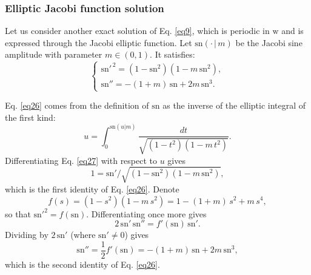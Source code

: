 \documentclass{article}
\begin{document}
            \subsubsection{Elliptic Jacobi function solution}
                Let us consider another exact solution of Eq. \ref{eq9}, which is periodic in \(\mathrm{w}\) and is expressed through the Jacobi elliptic function.
                Let \(\mathrm{sn}(\cdot\,|\,m)\) be the Jacobi sine amplitude with parameter \(m \in (0,1)\). It satisfies:
                \begin{equation} \label{eq26}
                    \begin{cases}
                        \mathrm{sn}'^{\,2} = \left(1-\mathrm{sn}^{2}\right)\left(1-m\,\mathrm{sn}^{2}\right),\\
                        \mathrm{sn}'' = -(1+m)\,\mathrm{sn} + 2m\,\mathrm{sn}^{3}.
                    \end{cases}
                \end{equation}

                Eq. \ref{eq26} comes from the definition of \(\mathrm{sn}\) as the inverse of the elliptic integral of the first kind:
                \begin{equation} \label{eq27}
                    u = \int_{0}^{\mathrm{sn}(u|m)} \frac{dt}{\sqrt{\left(1-t^{2}\right)\left(1-m\,t^{2}\right)}}.
                \end{equation}
                Differentiating Eq. \ref{eq27} with respect to \(u\) gives
                \begin{equation}
                    1 = \mathrm{sn}'\big/\sqrt{\left(1-\mathrm{sn}^{2}\right)\left(1-m\,\mathrm{sn}^{2}\right)},
                \end{equation}
                which is the first identity of Eq. \ref{eq26}.
                Denote
                \begin{equation}
                    f(s) = \left(1-s^{2}\right)\left(1-m\,s^{2}\right) = 1-(1+m)\,s^{2}+m\,s^{4},
                \end{equation}
                so that \(\mathrm{sn}'^{2} = f(\mathrm{sn})\). Differentiating once more gives
                \begin{equation}
                    2\,\mathrm{sn}'\,\mathrm{sn}'' = f'(\mathrm{sn})\,\mathrm{sn}'.
                \end{equation}
                Dividing by \(2\,\mathrm{sn}'\) (where \(\mathrm{sn}'\neq 0\)) gives
                \begin{equation}
                    \mathrm{sn}'' = \frac{1}{2}f'(\mathrm{sn}) = -(1+m)\,\mathrm{sn} + 2m\,\mathrm{sn}^{3},
                \end{equation}
                which is the second identity of Eq. \ref{eq26}.
\end{document}

